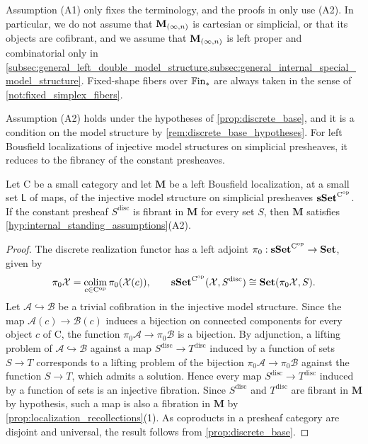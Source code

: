 \documentclass[10pt,reqno]{amsart}
\begin{document}
Assumption \textup{(A1)} only fixes the terminology, and the proofs in
only use \textup{(A2)}. In particular, we do not assume that $\mathbf M_{(\infty,n)}$
is cartesian or simplicial, or that its objects are cofibrant, and we
assume that $\mathbf M_{(\infty,n)}$ is left proper and combinatorial only in
\cref{subsec:general_left_double_model_structure,subsec:general_internal_special_model_structure}.
Fixed-shape fibers over $\mathbb{F}\mathrm{in}_*$ are always taken in the sense of
\cref{not:fixed_simplex_fibers}.

Assumption \textup{(A2)} holds under the hypotheses of
\cref{prop:discrete_base}, and it is a condition on the model
structure by \cref{rem:discrete_base_hypotheses}. For left Bousfield
localizations of injective model structures on simplicial presheaves,
it reduces to the fibrancy of the constant presheaves.

\begin{proposition}
\label{prop:presheaf_discrete_criterion}
Let $\mathrm C$ be a small category and let $\mathbf M$ be a left
Bousfield localization, at a small set $\mathsf L$ of maps, of the
injective model structure on simplicial presheaves
$\mathbf{sSet}^{\mathrm C^{\mathrm{op}}}$. If the constant presheaf
$S^{\mathrm{disc}}$ is fibrant in $\mathbf M$ for every set $S$,
then $\mathbf M$ satisfies
\cref{hyp:internal_standing_assumptions}\textup{(A2)}.
\end{proposition}

\begin{proof}
The discrete realization functor has a left adjoint
$\pi_0:\mathbf{sSet}^{\mathrm C^{\mathrm{op}}}\to\mathbf{Set}$, given by
\[
\pi_0\mathcal X=
\operatorname*{colim}_{c\in\mathrm C^{\mathrm{op}}}
\pi_0(\mathcal X(c)),
\qquad
\mathbf{sSet}^{\mathrm C^{\mathrm{op}}}(\mathcal X,S^{\mathrm{disc}})
\cong\mathbf{Set}(\pi_0\mathcal X,S).
\]
Let $\mathcal A\hookrightarrow\mathcal B$ be a trivial cofibration in
the injective model structure. Since the map
$\mathcal A(c)\to\mathcal B(c)$ induces a bijection on connected
components for every object $c$ of $\mathrm C$, the function
$\pi_0\mathcal A\to\pi_0\mathcal B$ is a bijection. By adjunction, a
lifting problem of $\mathcal A\hookrightarrow\mathcal B$ against a
map $S^{\mathrm{disc}}\to T^{\mathrm{disc}}$ induced by a function
of sets $S\to T$ corresponds to a lifting problem of the bijection
$\pi_0\mathcal A\to\pi_0\mathcal B$ against the function $S\to T$,
which admits a solution. Hence every map
$S^{\mathrm{disc}}\to T^{\mathrm{disc}}$ induced by a function of
sets is an injective fibration. Since $S^{\mathrm{disc}}$ and
$T^{\mathrm{disc}}$ are fibrant in $\mathbf M$ by hypothesis, such
a map is also a fibration in $\mathbf M$ by
\cref{prop:localization_recollections}(1). As coproducts in a presheaf
category are disjoint and universal, the result follows from
\cref{prop:discrete_base}.
\end{proof}
\end{document}
